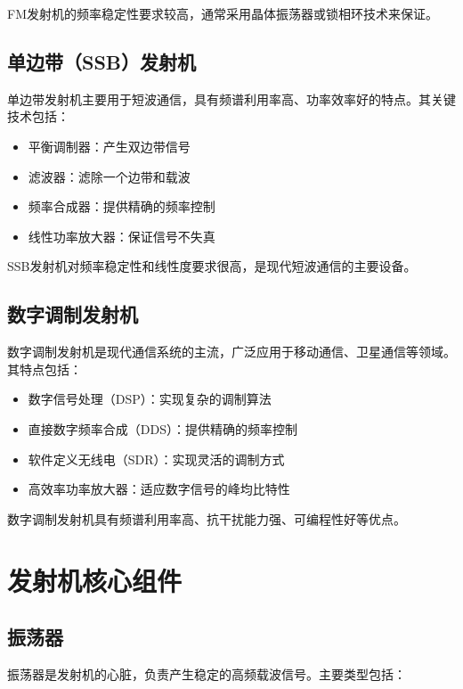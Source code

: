 \documentclass[12pt,UTF8]{ctexbook}
\begin{document}
FM发射机的频率稳定性要求较高，通常采用晶体振荡器或锁相环技术来保证。

\subsection{单边带（SSB）发射机}

单边带发射机主要用于短波通信，具有频谱利用率高、功率效率好的特点。其关键技术包括：

\begin{itemize}[leftmargin=3.5em]
    \item 平衡调制器：产生双边带信号
    \item 滤波器：滤除一个边带和载波
    \item 频率合成器：提供精确的频率控制
    \item 线性功率放大器：保证信号不失真
\end{itemize}

SSB发射机对频率稳定性和线性度要求很高，是现代短波通信的主要设备。

\subsection{数字调制发射机}

数字调制发射机是现代通信系统的主流，广泛应用于移动通信、卫星通信等领域。其特点包括：

\begin{itemize}[leftmargin=3.5em]
    \item 数字信号处理（DSP）：实现复杂的调制算法
    \item 直接数字频率合成（DDS）：提供精确的频率控制
    \item 软件定义无线电（SDR）：实现灵活的调制方式
    \item 高效率功率放大器：适应数字信号的峰均比特性
\end{itemize}

数字调制发射机具有频谱利用率高、抗干扰能力强、可编程性好等优点。

\section{发射机核心组件}

\subsection{振荡器}

振荡器是发射机的心脏，负责产生稳定的高频载波信号。主要类型包括：
\end{document}
